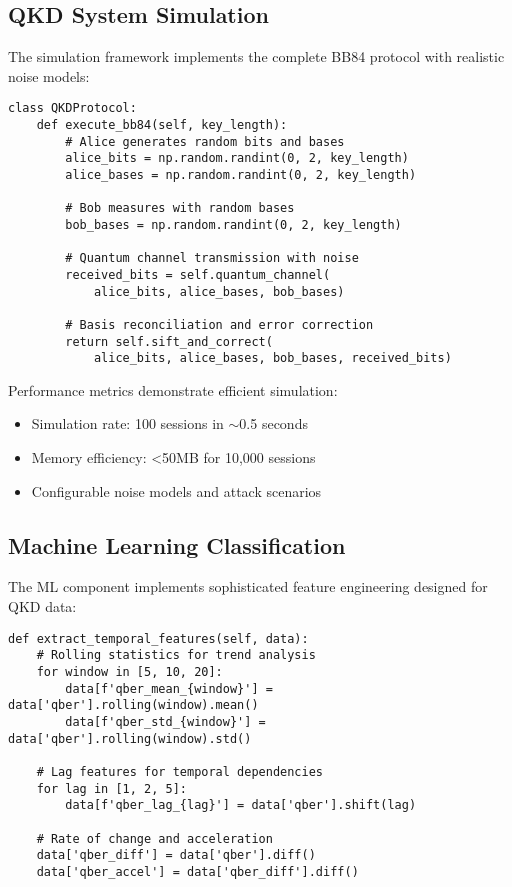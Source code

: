 \documentclass[12pt,a4paper]{article}
\begin{document}
\subsection{QKD System Simulation}

The simulation framework implements the complete BB84 protocol with realistic noise models:

\begin{lstlisting}[caption=BB84 Protocol Implementation]
class QKDProtocol:
    def execute_bb84(self, key_length):
        # Alice generates random bits and bases
        alice_bits = np.random.randint(0, 2, key_length)
        alice_bases = np.random.randint(0, 2, key_length)
        
        # Bob measures with random bases
        bob_bases = np.random.randint(0, 2, key_length)
        
        # Quantum channel transmission with noise
        received_bits = self.quantum_channel(
            alice_bits, alice_bases, bob_bases)
        
        # Basis reconciliation and error correction
        return self.sift_and_correct(
            alice_bits, alice_bases, bob_bases, received_bits)
\end{lstlisting}

Performance metrics demonstrate efficient simulation:
\begin{itemize}
    \item Simulation rate: 100 sessions in $\sim$0.5 seconds
    \item Memory efficiency: <50MB for 10,000 sessions
    \item Configurable noise models and attack scenarios
\end{itemize}

\subsection{Machine Learning Classification}

The ML component implements sophisticated feature engineering designed for QKD data:

\begin{lstlisting}[caption=Feature Engineering for QKD Data]
def extract_temporal_features(self, data):
    # Rolling statistics for trend analysis
    for window in [5, 10, 20]:
        data[f'qber_mean_{window}'] = data['qber'].rolling(window).mean()
        data[f'qber_std_{window}'] = data['qber'].rolling(window).std()
    
    # Lag features for temporal dependencies
    for lag in [1, 2, 5]:
        data[f'qber_lag_{lag}'] = data['qber'].shift(lag)
    
    # Rate of change and acceleration
    data['qber_diff'] = data['qber'].diff()
    data['qber_accel'] = data['qber_diff'].diff()
\end{lstlisting}
\end{document}
